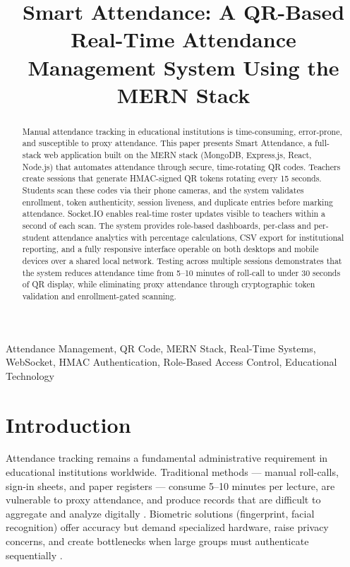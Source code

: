 \documentclass[conference]{IEEEtran}
\begin{document}
\title{Smart Attendance: A QR-Based Real-Time Attendance Management System Using the MERN Stack}

\author{
}

\maketitle

\begin{abstract}
Manual attendance tracking in educational institutions is time-consuming, error-prone, and susceptible to proxy attendance. This paper presents Smart Attendance, a full-stack web application built on the MERN stack (MongoDB, Express.js, React, Node.js) that automates attendance through secure, time-rotating QR codes. Teachers create sessions that generate HMAC-signed QR tokens rotating every 15 seconds. Students scan these codes via their phone cameras, and the system validates enrollment, token authenticity, session liveness, and duplicate entries before marking attendance. Socket.IO enables real-time roster updates visible to teachers within a second of each scan. The system provides role-based dashboards, per-class and per-student attendance analytics with percentage calculations, CSV export for institutional reporting, and a fully responsive interface operable on both desktops and mobile devices over a shared local network. Testing across multiple sessions demonstrates that the system reduces attendance time from 5--10 minutes of roll-call to under 30 seconds of QR display, while eliminating proxy attendance through cryptographic token validation and enrollment-gated scanning.
\end{abstract}

\begin{IEEEkeywords}
Attendance Management, QR Code, MERN Stack, Real-Time Systems, WebSocket, HMAC Authentication, Role-Based Access Control, Educational Technology
\end{IEEEkeywords}

\section{Introduction}
Attendance tracking remains a fundamental administrative requirement in educational institutions worldwide. Traditional methods --- manual roll-calls, sign-in sheets, and paper registers --- consume 5--10 minutes per lecture, are vulnerable to proxy attendance, and produce records that are difficult to aggregate and analyze digitally \cite{b1}. Biometric solutions (fingerprint, facial recognition) offer accuracy but demand specialized hardware, raise privacy concerns, and create bottlenecks when large groups must authenticate sequentially \cite{b2}.
\end{document}
